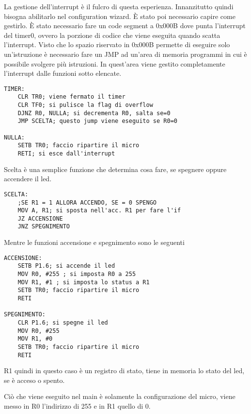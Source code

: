 \documentclass[main.tex]{subfiles}
\begin{document}
La gestione dell'interrupt è il fulcro di questa esperienza. Innanzitutto quindi bisogna abilitarlo nel configuration wizard. È stato poi necessario capire come gestirlo. È stato necessario fare un code segment a 0x000B dove punta l'interrupt del timer0, ovvero la porzione di codice che viene eseguita quando scatta l'interrupt. Visto che lo spazio riservato in 0x000B permette di eseguire solo un'istruzione è necessario fare un JMP ad un'area di memoria programmi in cui è possibile svolgere più istruzioni. In quest'area viene gestito completamente l'interrupt dalle funzioni sotto elencate.

\begin{lstlisting}[caption=Funzione timer]
TIMER:
    CLR TR0; viene fermato il timer
    CLR TF0; si pulisce la flag di overflow
    DJNZ R0, NULLA; si decrementa R0, salta se=0
    JMP SCELTA; questo jump viene eseguito se R0=0

NULLA:
    SETB TR0; faccio ripartire il micro
    RETI; si esce dall'interrupt
\end{lstlisting}
 
 Scelta è una semplice funzione che determina cosa fare, se spegnere oppure accendere il led.
 \begin{lstlisting}[caption=Funzione scelta]
 SCELTA:
	;SE R1 = 1 ALLORA ACCENDO, SE = 0 SPENGO
	MOV A, R1; si sposta nell'acc. R1 per fare l'if
	JZ ACCENSIONE
	JNZ SPEGNIMENTO
 \end{lstlisting}

Mentre le funzioni accensione e spegnimento sono le seguenti
\begin{lstlisting}[caption=Funzioni accensione e spegnimento]
ACCENSIONE:
	SETB P1.6; si accende il led
	MOV R0, #255 ; si imposta R0 a 255
	MOV R1, #1 ; si imposta lo status a R1
	SETB TR0; faccio ripartire il micro
	RETI

SPEGNIMENTO:
	CLR P1.6; si spegne il led
	MOV R0, #255
	MOV R1, #0
	SETB TR0; faccio ripartire il micro
	RETI
\end{lstlisting}
R1 quindi in questo caso è un registro di stato, tiene in memoria lo stato del led, se è acceso o spento.

Ciò che viene eseguito nel main è solamente la configurazione del micro, viene messo in R0 l'indirizzo di 255 e in R1 quello di 0.
\end{document}
